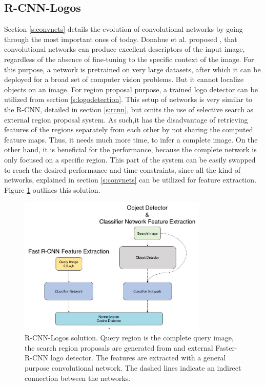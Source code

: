 \subsection{R-CNN-Logos}\label{ss:solution4}
Section \ref{s:convnets} details the evolution of convolutional networks by going through the most important ones of today. Donahue et al. proposed \cite{DBLP:journals/corr/DonahueJVHZTD13}, that convolutional networks can produce excellent descriptors of the input image, regardless of the absence of fine-tuning to the specific context of the image. For this purpose, a network is pretrained on very large datasets, after which it can be deployed for a broad set of computer vision problems. But it cannot localize objects on an image. For region proposal purpose, a trained logo detector can be utilized from section \ref{s:logodetection}. This setup of networks is very similar to the R-CNN, detailed in section \ref{s:rcnn}, but omits the use of selective search as external region proposal system. As such,it has the disadvantage of retrieving features of the regions separately from each other by not sharing the computed feature maps. Thus, it needs much more time, to infer a complete image. On the other hand, it is beneficial for the performance, because the complete network is only focused on a specific region. This part of the system can be easily swapped to reach the desired performance and time constraints, since all the kind of networks, explained in section \ref{s:convnets} can be utilized for feature extraction. Figure \ref{f:sol4arch} outlines this solution.
\begin{figure}
  \centering
  \includegraphics[width=90mm]{images/mt/sol4_arch.jpg}
  \caption{R-CNN-Logos solution. Query region is the complete query image, the search region proposals are generated from and external Faster-R-CNN logo detector. The features are extracted with a general purpose convolutional network. The dashed lines indicate an indirect connection between the networks.}
  \label{f:sol4arch}
\end{figure}


